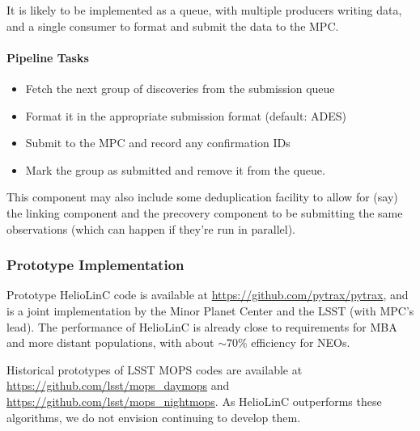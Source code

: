 It is likely to be implemented as a queue, with multiple producers writing data, and a single consumer to format and submit the data to the MPC.

\paragraph{Pipeline Tasks}

\begin{itemize}
	\item Fetch the next group of discoveries from the submission queue
	\item Format it in the appropriate submission format (default: ADES)
	\item Submit to the MPC and record any confirmation IDs
	\item Mark the group as submitted and remove it from the queue.
\end{itemize}

This component may also include some deduplication facility to allow for (say) the linking component and the precovery component to be submitting the same observations (which can happen if they're run in parallel).

\subsubsection{Prototype Implementation}

Prototype HelioLinC code is available at \url{https://github.com/pytrax/pytrax}, and is a joint implementation by the Minor Planet Center and the LSST (with MPC's lead). The performance of HelioLinC is already close to requirements for MBA and more distant populations, with about $\sim70$\% efficiency for NEOs.

Historical prototypes of LSST MOPS codes are available at \url{https://github.com/lsst/mops_daymops} and \url{https://github.com/lsst/mops_nightmops}. As HelioLinC outperforms these algorithms, we do not envision continuing to develop them.
